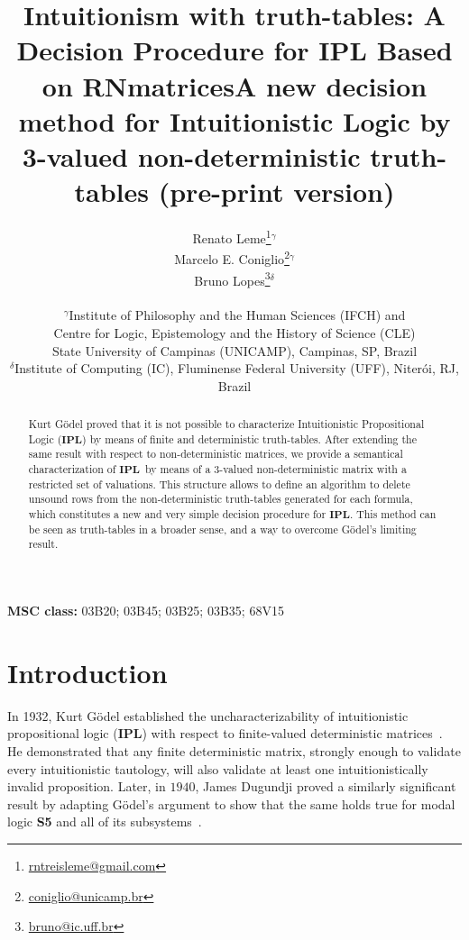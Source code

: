 \documentclass[12pt]{article}
\title{Intuitionism with truth-tables: A Decision Procedure for \textbf{IPL} Based on RNmatrices}
\title{A new decision method for Intuitionistic Logic by 3-valued non-deterministic truth-tables (pre-print version)}
\author{
Renato Leme\footnote{\href{mailto:rntreisleme@gmail.com}{rntreisleme@gmail.com}}\hspace{0.2cm}$^{\gamma} $\\ 
Marcelo E. Coniglio\footnote{\href{mailto:coniglio@unicamp.br}{coniglio@unicamp.br}}\hspace{0.2cm}$^{\gamma}$ \\
Bruno Lopes\footnote{\href{mailto:bruno@ic.uff.br}{bruno@ic.uff.br}}\hspace{0.2cm}$^{\delta}$
\\
\\ 
$^{\gamma}${\small Institute of Philosophy and the Human Sciences (IFCH) and}\\ 
{\small Centre for Logic, Epistemology and the History of Science (CLE)}\\
{\small State University of Campinas (UNICAMP), Campinas, SP, Brazil}\\ 
$^{\delta}${\small Institute of Computing (IC), Fluminense Federal University (UFF), Niterói, RJ, Brazil} 
}
\date{}
\newcommand{\ipl}{\ensuremath{\mathbf{IPL}}}
\begin{document}
\sloppy

\maketitle

\begin{abstract}
   Kurt Gödel proved that it is not possible to characterize Intuitionistic Propositional Logic (\ipl) by means of finite and deterministic truth-tables. After extending the same result with respect to non-deterministic matrices, we provide a semantical characterization of \ipl\ by means of a $3$-valued  non-deterministic matrix with a restricted set of valuations. This structure allows to define an algorithm to delete unsound rows from the non-deterministic truth-tables generated for each formula, which constitutes a new and very simple decision procedure for \ipl. This method can be seen as truth-tables in a broader sense, and a way to overcome G\"odel's limiting result.
\end{abstract}

{\bf MSC class:} 03B20; 03B45; 03B25; 03B35; 68V15

\section{Introduction} \label{sect:Intro}

In 1932, Kurt Gödel established the uncharacterizability of intuitionistic propositional logic (\textbf{IPL}) with respect to finite-valued deterministic matrices~\cite{Godel1932}. He demonstrated that any finite deterministic matrix, strongly enough to validate every intuitionistic tautology, will also validate at least one intuitionistically invalid proposition. Later, in $1940$, James Dugundji proved a similarly significant result by adapting Gödel's argument to show that the same holds true for modal logic \textbf{S5} and all of its subsystems~\cite{dugun:40}.
\end{document}
